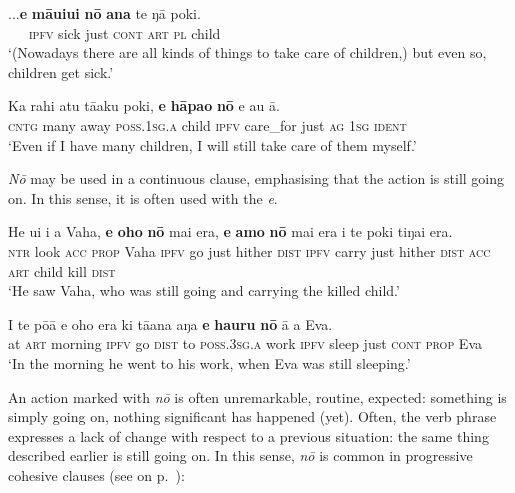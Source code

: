 \ea\label{ex:7.106}
\gll ...\textbf{e} \textbf{māuiui} \textbf{nō} \textbf{{\ꞌ}ana} te ŋā poki. \\
~~~\textsc{ipfv} sick just \textsc{cont} \textsc{art} \textsc{pl} child \\

\glt 
‘(Nowadays there are all kinds of things to take care of children,) but even so, children get sick.’ \textstyleExampleref{[R380.138]} 
\z

\ea\label{ex:7.107}
\gll Ka rahi atu tā{\ꞌ}aku poki, \textbf{e} \textbf{hāpa{\ꞌ}o} \textbf{nō} e au {\ꞌ}ā.\\
\textsc{cntg} many away \textsc{poss.1sg.a} child \textsc{ipfv} care\_for just \textsc{ag} \textsc{1sg} \textsc{ident}\\

\glt 
‘Even if I have many children, I will still take care of them myself.’ \textstyleExampleref{[R229.023]} 
\z

\textit{Nō} may be used in a continuous clause, emphasising that the action is still going on. In this sense, it is often used with the  \textit{e}. 

\ea\label{ex:7.108}
\gll He u{\ꞌ}i i a Vaha, \textbf{e} \textbf{oho} \textbf{nō} mai era, \textbf{e} \textbf{{\ꞌ}amo} \textbf{nō} mai era i te poki tiŋa{\ꞌ}i era.\\
\textsc{ntr} look \textsc{acc} \textsc{prop} Vaha \textsc{ipfv} go just hither \textsc{dist} \textsc{ipfv} carry just hither \textsc{dist} \textsc{acc} \textsc{art} child kill \textsc{dist}\\

\glt 
‘He saw Vaha, who was still going and carrying the killed child.’ \textstyleExampleref{[Mtx-3-01.144]}
\z

\ea\label{ex:7.109}
\gll {\ꞌ}I te pō{\ꞌ}ā e oho era ki tā{\ꞌ}ana aŋa \textbf{e} \textbf{ha{\ꞌ}uru} \textbf{nō} {\ꞌ}ā a Eva. \\
at \textsc{art} morning \textsc{ipfv} go \textsc{dist} to \textsc{poss.3sg.a} work \textsc{ipfv} sleep just \textsc{cont} \textsc{prop} Eva \\

\glt
‘In the morning he went to his work, when Eva was still sleeping.’ \textstyleExampleref{[R210.025]} 
\z

An action marked with \textit{nō} is often unremarkable, routine, expected: something is simply going on, nothing significant has happened (yet). Often, the verb phrase expresses a lack of change with respect to a previous situation: the same thing described earlier is still going on. In this sense, \textit{nō} is common in progressive cohesive clauses (see  on p.~\pageref{ex:11.213}):

